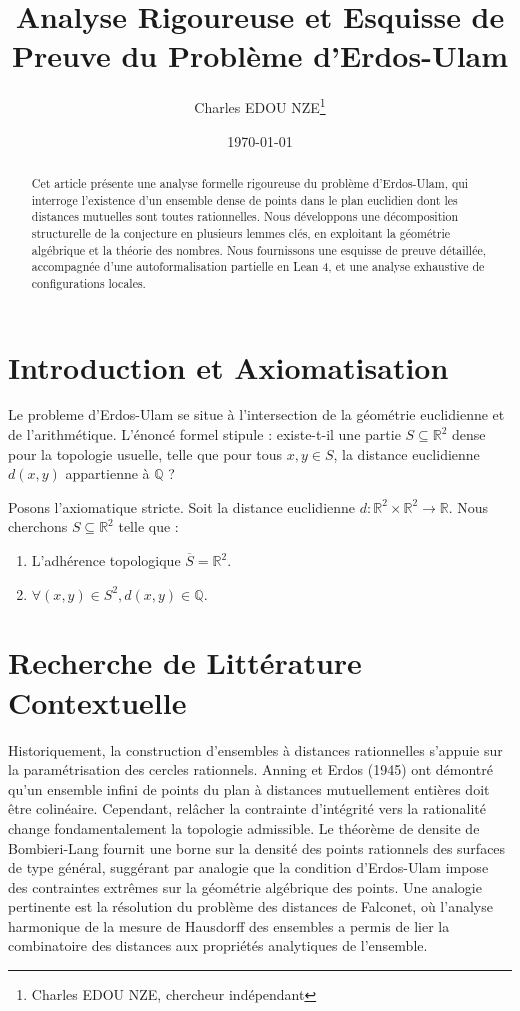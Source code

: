 \documentclass[12pt, a4paper]{article}
\author{Charles EDOU NZE\thanks{Charles EDOU NZE, chercheur indépendant}}
\title{Analyse Rigoureuse et Esquisse de Preuve du Problème d'Erdos-Ulam}
\date{\today}
\begin{document}
\maketitle

\begin{abstract}
Cet article présente une analyse formelle rigoureuse du problème d'Erdos-Ulam, qui interroge l'existence d'un ensemble dense de points dans le plan euclidien dont les distances mutuelles sont toutes rationnelles. Nous développons une décomposition structurelle de la conjecture en plusieurs lemmes clés, en exploitant la géométrie algébrique et la théorie des nombres. Nous fournissons une esquisse de preuve détaillée, accompagnée d'une autoformalisation partielle en Lean 4, et une analyse exhaustive de configurations locales.
\end{abstract}

\tableofcontents
\newpage

\section{Introduction et Axiomatisation}
Le probleme d'Erdos-Ulam se situe à l'intersection de la géométrie euclidienne et de l'arithmétique. L'énoncé formel stipule : existe-t-il une partie $S \subseteq \mathbb{R}^2$ dense pour la topologie usuelle, telle que pour tous $x, y \in S$, la distance euclidienne $d(x, y)$ appartienne à $\mathbb{Q}$ ?

Posons l'axiomatique stricte. Soit la distance euclidienne $d : \mathbb{R}^2 \times \mathbb{R}^2 \to \mathbb{R}$.
Nous cherchons $S \subseteq \mathbb{R}^2$ telle que :
\begin{enumerate}
    \item L'adhérence topologique $\overline{S} = \mathbb{R}^2$.
    \item $\forall (x, y) \in S^2, d(x, y) \in \mathbb{Q}$.
\end{enumerate}

\section{Recherche de Littérature Contextuelle}
Historiquement, la construction d'ensembles à distances rationnelles s'appuie sur la paramétrisation des cercles rationnels. Anning et Erdos (1945) ont démontré qu'un ensemble infini de points du plan à distances mutuellement entières doit être colinéaire. Cependant, relâcher la contrainte d'intégrité vers la rationalité change fondamentalement la topologie admissible. Le théorème de densite de Bombieri-Lang fournit une borne sur la densité des points rationnels des surfaces de type général, suggérant par analogie que la condition d'Erdos-Ulam impose des contraintes extrêmes sur la géométrie algébrique des points. Une analogie pertinente est la résolution du problème des distances de Falconet, où l'analyse harmonique de la mesure de Hausdorff des ensembles a permis de lier la combinatoire des distances aux propriétés analytiques de l'ensemble.
\end{document}
